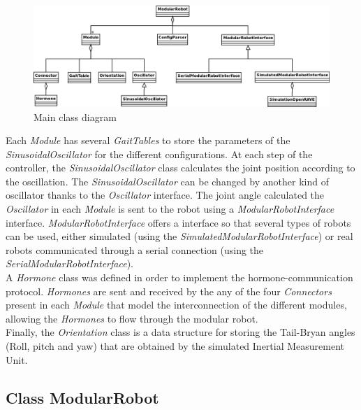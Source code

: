 \begin{figure}[h]
		\centering
        \includegraphics[width=\textwidth]{images/Class_diagram_Main.png}
        \caption{Main class diagram}\label{fig:software_class_main_class}
\end{figure}


Each \emph{Module} has several \emph{GaitTables} to store the parameters of the \emph{SinusoidalOscillator} for the different configurations. At each step of the controller, the \emph{SinusoidalOscillator} class calculates the joint position according to the oscillation. The \emph{SinusoidalOscillator} can be changed by another kind of oscillator thanks to the \emph{Oscillator} interface. The joint angle calculated the \emph{Oscillator} in each \emph{Module} is sent to the robot using a \emph{ModularRobotInterface} interface. \emph{ModularRobotInterface} offers a interface so that several types of robots can be used, either simulated (using the \emph{SimulatedModularRobotInterface}) or real robots communicated through a serial connection (using the \emph{SerialModularRobotInterface}).\\

A \emph{Hormone} class was defined in order to implement the hormone-communication protocol. \emph{Hormones} are sent and received by the any of the four \emph{Connectors} present in each \emph{Module} that model the interconnection of the different modules, allowing the \emph{Hormones} to flow through the modular robot.\\

Finally, the \emph{Orientation} class is a data structure for storing the Tail-Bryan angles (Roll, pitch and yaw) that are obtained by the simulated Inertial Measurement Unit. 


\subsection{Class ModularRobot}
\label{software_class_modularrobot}

